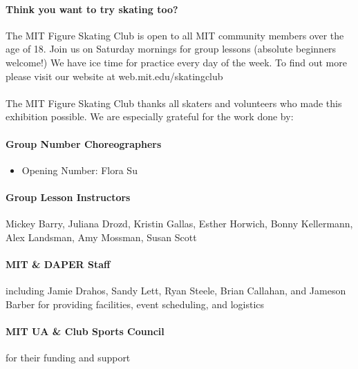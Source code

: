 \documentclass[12pt]{article}
\begin{document}
\begin{multicols*}{2}


\paragraph{Think you want to try skating too?} The MIT Figure Skating Club is open to all MIT community members over the age of 18. Join us on Saturday mornings for group lessons (absolute beginners welcome!) We have ice time for practice every day of the week. To find out more please visit our website at web.mit.edu/skatingclub

\paragraph{} The MIT Figure Skating Club thanks all skaters and volunteers who made this exhibition possible. We are especially grateful for the work done by:

\paragraph{Group Number Choreographers}
\begin{itemize}
    \item Opening Number: Flora Su
\end{itemize}

\paragraph{Group Lesson Instructors} Mickey Barry, Juliana Drozd, Kristin Gallas, Esther Horwich, Bonny Kellermann, Alex Landsman, Amy Mossman, Susan Scott
\paragraph{MIT \& DAPER Staff} including Jamie Drahos, Sandy Lett, Ryan Steele, Brian Callahan, and Jameson Barber for providing facilities, event scheduling, and logistics
\paragraph{MIT UA \& Club Sports Council} for their funding and support

\vfill\null
\columnbreak


\begin{center}


\end{center}
\end{multicols*}
\end{document}
